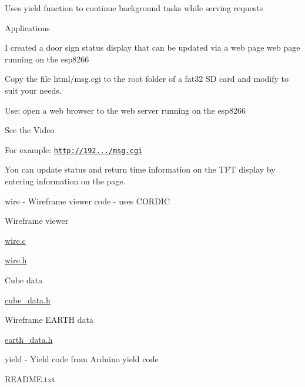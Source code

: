 \begin{DoxyItemize}
\begin{DoxyItemize}
\begin{DoxyItemize}
\end{DoxyItemize}
\item Uses yield function to continue background tasks while serving requests
\item Applications
\begin{DoxyItemize}
\item I created a door sign status display that can be updated via a web page web page running on the esp8266
\item Copy the file html/msg.\+cgi to the root folder of a fat32 SD card and modify to suit your needs.
\item Use\+: open a web browser to the web server running on the esp8266
\begin{DoxyItemize}
\item See the Video
\item For example\+: \href{http://192.168.200.116/msg.cgi}{\tt http\+://192.../msg.\+cgi}
\item You can update status and return time information on the T\+FT display by entering information on the page.
\end{DoxyItemize}
\end{DoxyItemize}
\end{DoxyItemize}
\item wire -\/ Wireframe viewer code -\/ uses C\+O\+R\+D\+IC
\begin{DoxyItemize}
\item Wireframe viewer
\begin{DoxyItemize}
\item \hyperlink{wire_8c}{wire.\+c}
\item \hyperlink{wire_8h}{wire.\+h}
\end{DoxyItemize}
\item Cube data
\begin{DoxyItemize}
\item \hyperlink{cube__data_8h}{cube\+\_\+data.\+h}
\end{DoxyItemize}
\item Wireframe E\+A\+R\+TH data
\begin{DoxyItemize}
\item \hyperlink{earth__data_8h}{earth\+\_\+data.\+h}
\end{DoxyItemize}
\end{DoxyItemize}
\item yield -\/ Yield code from Arduino yield code
\begin{DoxyItemize}
\item R\+E\+A\+D\+M\+E.\+txt

\end{DoxyItemize}
\end{DoxyItemize}
